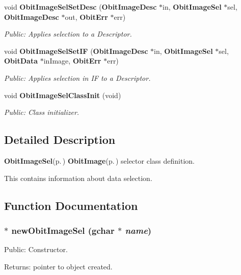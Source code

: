 \begin{CompactItemize}
void {\bf Obit\-Image\-Sel\-Set\-Desc} ({\bf Obit\-Image\-Desc} $\ast$in, {\bf Obit\-Image\-Sel} $\ast$sel, {\bf Obit\-Image\-Desc} $\ast$out, {\bf Obit\-Err} $\ast$err)
\begin{CompactList}\small\item\em Public: Applies selection to a Descriptor. \item\end{CompactList}\item 
void {\bf Obit\-Image\-Sel\-Set\-IF} ({\bf Obit\-Image\-Desc} $\ast$in, {\bf Obit\-Image\-Sel} $\ast$sel, {\bf Obit\-Data} $\ast$in\-Image, {\bf Obit\-Err} $\ast$err)
\begin{CompactList}\small\item\em Public: Applies selection in IF to a Descriptor. \item\end{CompactList}\item 
void {\bf Obit\-Image\-Sel\-Class\-Init} (void)
\begin{CompactList}\small\item\em Public: Class initializer. \item\end{CompactList}\end{CompactItemize}


\subsection{Detailed Description}
{\bf Obit\-Image\-Sel}{\rm (p.\,\pageref{structObitImageSel})} {\bf Obit\-Image}{\rm (p.\,\pageref{structObitImage})} selector class definition. 

This contains information about data selection.

\subsection{Function Documentation}
\subsubsection{$\ast$ new\-Obit\-Image\-Sel (gchar $\ast$ {\em name})}\label{ObitImageSel_8c_a6}


Public: Constructor. 

\begin{Desc}
\item[Returns:]pointer to object created. \end{Desc}
